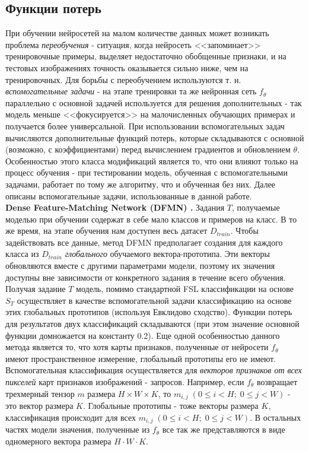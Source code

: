 \documentclass[a4paper, 12pt]{report}
\begin{document}
\subsection{Функции потерь}
При обучении нейросетей на малом количестве данных может возникать проблема \textit{переобучения} - ситуация, когда нейросеть <<запоминает>> тренировочные примеры, выделяет недостаточно обобщенные признаки, и на тестовых изображениях точность оказывается сильно ниже, чем на тренировочных. Для борьбы с переобучением используются т. н. \textit{вспомогательные задачи} - на этапе тренировки та же нейронная сеть $f_{\theta}$ параллельно с основной задачей используется для решения дополнительных - так модель меньше <<фокусируется>> на малочисленных обучающих примерах и получается более универсальной. При использовании вспомогательных задач вычисляются дополнительные функций потерь, которые складываются с основной (возможно, с коэффициентами) перед вычислением градиентов и обновлением $\theta$. Особенностью этого класса модификаций является то, что они влияют только на процесс обучения - при тестировании модель, обученная с вспомогательными задачами, работает по тому же алгоритму, что и обученная без них. Далее описаны вспомогательные задачи, использованные в данной работе. \\

\textbf {Dense Feature-Matching Network (DFMN) \cite{dfmn}.} Задания $T$, получаемые моделью при обучении содержат в себе мало классов и примеров на класс. В то же время, на этапе обучения нам доступен весь датасет $D_{train}$. Чтобы задействовать все данные, метод DFMN предполагает создания для каждого класса из $D_{train}$ \textit{глобального} обучаемого вектора-прототипа. Эти векторы обновляются вместе с другими параметрами модели, поэтому их значения доступны вне зависимости от конкретного задания в течение всего обучения. Получая задание $T$ модель, помимо стандартной FSL классификации на основе $S_{T}$ осуществляет в качестве вспомогательной задачи классификацию на основе этих глобальных прототипов (используя Евклидово сходство). Функции потерь для результатов двух классификаций складываются (при этом значение основной функции домножается на константу 0.2).  Еще одной особенностью данного метода является то, что хотя карты признаков, полученные от нейросети $f_{\theta}$ имеют пространственное измерение, глобальный прототипы его не имеют. Вспомогательная классификация осуществляется для \textit{векторов признаков от всех пикселей} карт признаков изображений - запросов. Например, если $f_{\theta}$ возвращает трехмерный тензор $m$ размера $H \times W \times K$, то $m_{i, j} \; (0 \le i < H; \; 0 \le j < W)$ - это вектор размера $K$. Глобальные прототипы - тоже векторы размера $K$, классификация происходит для всех $m_{i, j} \; (0 \le i < H; \; 0 \le j < W)$. В остальных частях модели значения, полученные из $f_{\theta}$ все так же представляются в виде одномерного вектора размера $H \cdot W \cdot K$. \\
\end{document}
